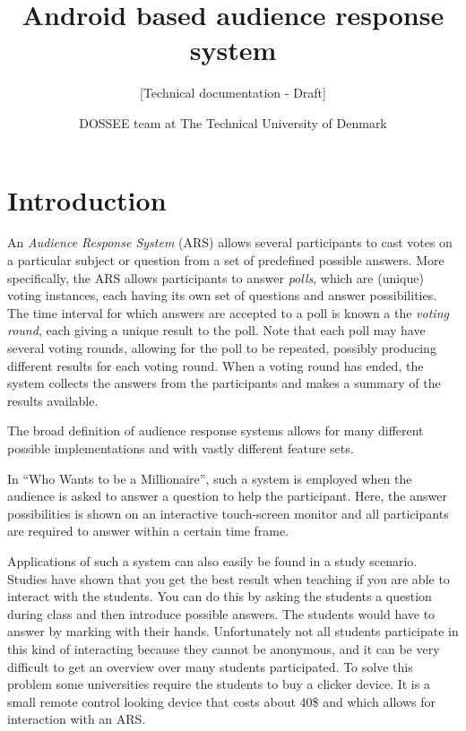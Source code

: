 \documentclass{acm_proc_article-sp}
\begin{document}
\title{Android based audience response system}
\subtitle{[Technical documentation - Draft]
}

\author{
\alignauthor DOSSEE team at The Technical University of Denmark
}


\maketitle

\begin{abstract}
\end{abstract}
\section{Introduction}
\label{sec:introduction}
An \textit{Audience Response System} (ARS) allows several participants to cast votes on a particular subject or question from a set of predefined possible answers. More specifically, the ARS allows participants to answer \textit{polls}, which are (unique) voting instances, each having its own set of questions and answer possibilities. The time interval for which answers are accepted to a poll is known a the \textit{voting round}, each giving a unique result to the poll. Note that each poll may have several voting rounds, allowing for the poll to be repeated, possibly producing different results for each voting round. When a voting round has ended, the system collects the answers from the participants and makes a summary of the results available. 

The broad definition of audience response systems allows for many different possible implementations and with vastly different feature sets.

In “Who Wants to be a Millionaire”, such a system is employed when the audience is asked to answer a question to help the participant. Here, the answer possibilities is shown on an interactive touch-screen monitor and all participants are required to answer within a certain time frame.

Applications of such a system can also easily be found in a study scenario. Studies have shown that you get the best result when teaching if you are able to interact with the students. You can do this by asking the students a question during class and then introduce possible answers. The students would have to answer by marking with their hands.  Unfortunately not all students participate in this kind of interacting because they cannot be anonymous, and it can be very difficult to get an overview over many students participated. To solve this problem some universities require the students to buy a clicker device. It is a small remote control looking device that costs about 40\$ and which allows for interaction with an ARS. 
\end{document}
